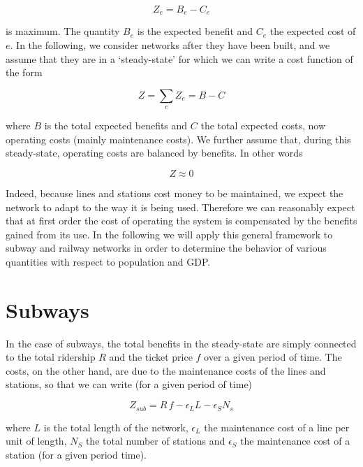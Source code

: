 \begin{equation} 
    Z_e = B_e - C_e 
\end{equation}

is maximum. The quantity $B_e$ is the expected benefit and $C_e$ the expected
cost of $e$. In the following, we consider networks after they have been built,
and we assume that they are in a `steady-state' for which we can write a cost
function of the form

\begin{equation} 
    Z =\sum_eZ_e= B - C 
\end{equation}

where $B$ is the total expected benefits and $C$ the total expected costs, now
operating costs (mainly maintenance costs). We further assume that, during this
steady-state, operating costs are balanced by benefits. In other words


\begin{equation} 
    Z \approx 0 
\end{equation} 

Indeed, because lines and stations cost money to be maintained, we expect the
network to adapt to the way it is being used. Therefore we can reasonably expect
that at first order the cost of operating the system is compensated by the
benefits gained from its use.  In the following we will apply this general
framework to subway and railway networks in order to determine the behavior of
various quantities with respect to population and GDP.

\section{Subways}

In the case of subways, the total benefits in the steady-state are simply
connected to the total ridership $R$ and the ticket price $f$ over a given
period of time. The costs, on the other hand, are due to the maintenance costs
of the lines and stations, so that we can write (for a given period of time)

\begin{equation}
    Z_{sub} = R\,f - \epsilon_L L - \epsilon_S N_s
    \label{eq:cost-benefit}
\end{equation}

where $L$ is the total length of the network, $\epsilon_L$ the maintenance cost
of a line per unit of length, $N_S$ the total number of stations and
$\epsilon_S$ the maintenance cost of a station (for a given period time).

